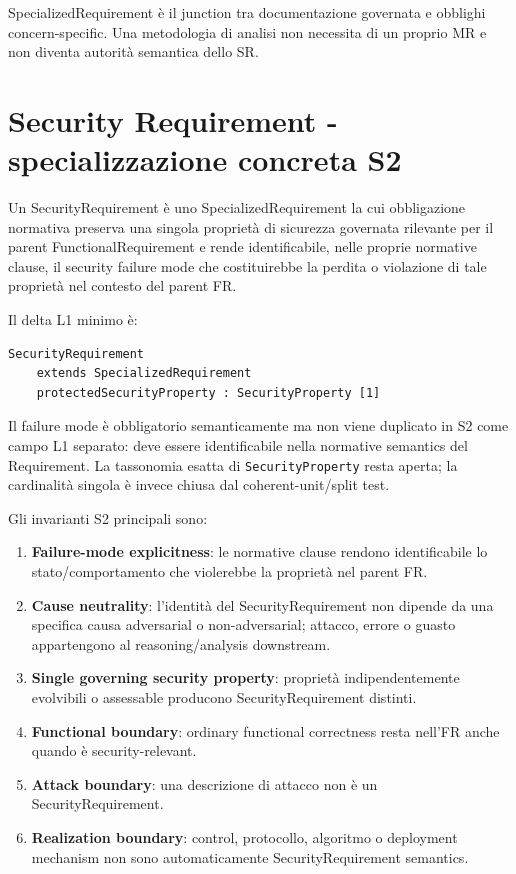 \documentclass[12pt,a4paper,oneside]{report}
\begin{document}
\begin{epistemicnote}
SpecializedRequirement è il junction tra documentazione governata e obblighi concern-specific. Una metodologia di analisi non necessita di un proprio MR e non diventa autorità semantica dello SR.
\end{epistemicnote}

\section{Security Requirement - specializzazione concreta S2}

\begin{resultnote}
Un SecurityRequirement è uno SpecializedRequirement la cui obbligazione normativa preserva una singola proprietà di sicurezza governata rilevante per il parent FunctionalRequirement e rende identificabile, nelle proprie normative clause, il security failure mode che costituirebbe la perdita o violazione di tale proprietà nel contesto del parent FR.
\end{resultnote}

Il delta L1 minimo è:
\begin{lstlisting}
SecurityRequirement
    extends SpecializedRequirement
    protectedSecurityProperty : SecurityProperty [1]
\end{lstlisting}

Il failure mode è obbligatorio semanticamente ma non viene duplicato in S2 come campo L1 separato: deve essere identificabile nella normative semantics del Requirement. La tassonomia esatta di \texttt{SecurityProperty} resta aperta; la cardinalità singola è invece chiusa dal coherent-unit/split test.

Gli invarianti S2 principali sono:
\begin{enumerate}
  \item \textbf{Failure-mode explicitness}: le normative clause rendono identificabile lo stato/comportamento che violerebbe la proprietà nel parent FR.
  \item \textbf{Cause neutrality}: l'identità del SecurityRequirement non dipende da una specifica causa adversarial o non-adversarial; attacco, errore o guasto appartengono al reasoning/analysis downstream.
  \item \textbf{Single governing security property}: proprietà indipendentemente evolvibili o assessable producono SecurityRequirement distinti.
  \item \textbf{Functional boundary}: ordinary functional correctness resta nell'FR anche quando è security-relevant.
  \item \textbf{Attack boundary}: una descrizione di attacco non è un SecurityRequirement.
  \item \textbf{Realization boundary}: control, protocollo, algoritmo o deployment mechanism non sono automaticamente SecurityRequirement semantics.
\end{enumerate}
\end{document}
